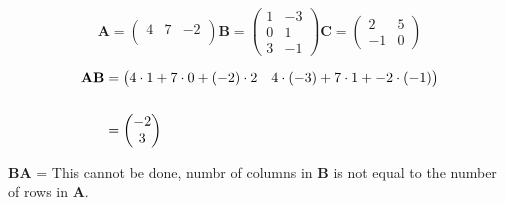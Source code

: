 \documentclass{tufte-handout}
\begin{document}

\begin{question}
    
    \[
    \textbf{A} = 
    \begin{pmatrix}
        4 & 7 & -2\\
    \end{pmatrix}
    \textbf{B} =
    \begin{pmatrix}
        1 & -3\\
        0 & 1\\
        3 & -1
    \end{pmatrix}
    \textbf{C} = 
    \begin{pmatrix}
        2 & 5\\
        -1 & 0
    \end{pmatrix}
    \]

    \qpart
    \qsubpart
    
    \begin{align*}
    \textbf{AB}
    &=
        \begin{pmatrix}
            4\cdot{1}+7\cdot{0}+\left(-2\right)\cdot{2} & 4\cdot{ \left(-3\right) }+7\cdot{1}+-2\cdot{ \left(-1\right) }\\
        \end{pmatrix}\\[15pt]
    &=
        \begin{pmatrix}
            -2\\
            3
        \end{pmatrix}
    \end{align*}
        
\vspace{3cm}

    \qsubpart
    \textbf{BA} = This cannot be done, numbr of columns in \textbf{B} is not equal to the number of rows in \textbf{A}.

\clearpage

\qsubpart
    

\end{question}
\end{document}

